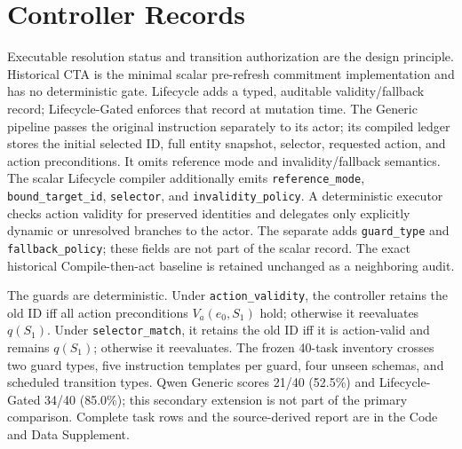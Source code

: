 \documentclass[10pt]{article}
\begin{document}
\FloatBarrier

\section{Controller Records}
Executable resolution status and transition authorization are the design principle. Historical CTA is the minimal scalar
pre-refresh commitment implementation and has no deterministic gate. Lifecycle adds a typed,
auditable validity/fallback record; Lifecycle-Gated enforces that record at mutation time.
The Generic pipeline passes the original instruction separately to its actor; its compiled
ledger stores the initial selected ID, full entity snapshot, selector, requested action, and
action preconditions. It omits
reference mode and invalidity/fallback semantics. The scalar Lifecycle compiler additionally
emits \texttt{reference\_mode}, \texttt{bound\_target\_id}, \texttt{selector}, and
\texttt{invalidity\_policy}. A deterministic executor checks action validity for preserved
identities and delegates only explicitly dynamic or unresolved branches to the actor. The
separate \GuardedExtension{} adds \texttt{guard\_type} and
\texttt{fallback\_policy}; these fields are not part of the scalar \PrimaryDiagnostic{} record. The exact
historical Compile-then-act baseline is retained unchanged as a neighboring audit.

The \GuardedExtension{} guards are deterministic. Under \texttt{action\_validity}, the controller retains the
old ID iff all action preconditions $V_a(e_0,S_1)$ hold; otherwise it reevaluates $q(S_1)$.
Under \texttt{selector\_match}, it retains the old ID iff it is action-valid and remains
$q(S_1)$; otherwise it reevaluates. The frozen 40-task inventory crosses two guard types, five
instruction templates per guard, four unseen schemas, and scheduled transition types. Qwen Generic
scores 21/40 (52.5\%) and Lifecycle-Gated 34/40 (85.0\%); this secondary extension is not part of
the primary comparison. Complete task rows and the source-derived report are in the Code and Data Supplement.
\end{document}
